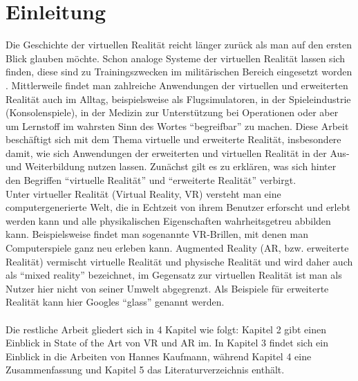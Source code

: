 \documentclass[deutsch]{llncs}
\begin{document}
\tableofcontents
\newpage


\section{Einleitung}
\label{sec:intro}
Die Geschichte der virtuellen Realität reicht länger zurück als man auf den ersten Blick glauben möchte. Schon analoge Systeme der virtuellen Realität lassen sich finden, diese sind zu Trainingszwecken im militärischen Bereich eingesetzt worden \cite{1}. 
Mittlerweile findet man zahlreiche Anwendungen der virtuellen und erweiterten Realität auch im Alltag, beispielsweise als Flugsimulatoren, in der Spieleindustrie (Konsolenspiele), in der Medizin zur Unterstützung bei Operationen oder aber um Lernstoff im wahrsten Sinn des Wortes ``begreifbar'' zu machen. 
Diese Arbeit beschäftigt sich mit dem Thema virtuelle und erweiterte Realität, insbesondere damit, wie sich Anwendungen der erweiterten und virtuellen Realität in der Aus- und Weiterbildung nutzen lassen. 
Zunächst gilt es zu erklären, was sich hinter den Begriffen ``virtuelle Realität'' und ``erweiterte Realität'' verbirgt. 
\noindent \\
Unter virtueller Realität (Virtual Reality, VR) versteht man eine computergenerierte Welt, die in Echtzeit von ihrem Benutzer erforscht und erlebt werden kann und alle physikalischen Eigenschaften wahrheitsgetreu abbilden kann. 
Beispielsweise findet man sogenannte VR-Brillen, mit denen man Computerspiele ganz neu erleben kann.
Augmented Reality (AR, bzw. erweiterte Realität) vermischt virtuelle Realität und physische Realität und wird daher auch als ``mixed reality'' bezeichnet, im Gegensatz zur virtuellen Realität ist man als Nutzer hier nicht von seiner Umwelt abgegrenzt.
Als Beispiele für erweiterte Realität kann hier Googles ``glass'' genannt werden. \\
\noindent \\
Die restliche Arbeit gliedert sich in 4 Kapitel wie folgt: 
Kapitel 2 gibt einen Einblick in State of the Art von VR und AR im. In Kapitel 3 findet sich ein Einblick in die Arbeiten von Hannes Kaufmann, während Kapitel 4 eine Zusammenfassung und Kapitel 5 das Literaturverzeichnis enthält.
\end{document}

